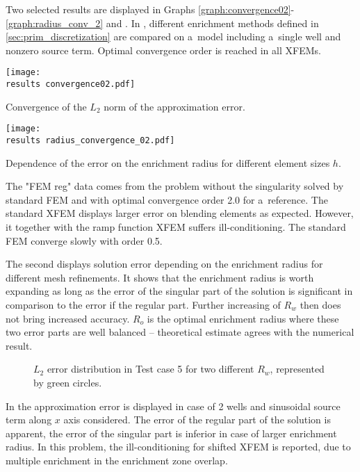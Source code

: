 Two selected results are displayed in Graphs \ref{graph:convergence02}-\ref{graph:radius_conv_2} and .
In , different enrichment methods defined in \ref{sec:prim_discretization} are compared
on a~model including a~single well and nonzero source term.
Optimal convergence order is reached in all XFEMs.
\begin{graph}[!htb]
  \centering    
  \texttt{[image: \\results convergence02.pdf]}
  \caption[Convergence comparison graph.]{Convergence of the $L_2$ norm of the approximation error.}
  \label{graph:convergence02}
\end{graph}
%
\begin{graph}[!htb]
  \centering    
  \texttt{[image: \\results radius\_convergence\_02.pdf]}
  \caption[Optimal enrichment radius.]{Dependence of the error on the enrichment radius for different
  element sizes $h$.}
  \label{graph:radius_conv_2}
\end{graph}
The "FEM reg" data comes from the problem without the singularity solved by standard FEM and with optimal convergence order 2.0 for a~reference.
The standard XFEM displays larger error on blending elements as expected.
However, it together with the ramp function XFEM suffers ill-conditioning.
The standard FEM converge slowly with order 0.5.

The second  displays solution error depending on the enrichment radius
for different mesh refinements. It shows that the enrichment radius is worth expanding as long as
the error of the singular part of the solution is significant in comparison to the error if the regular part.
Further increasing of $R_w$ then does not bring increased accuracy. $R_o$ is the optimal enrichment radius
where these two error parts are well balanced -- theoretical estimate agrees with the numerical result.

\begin{figure}[!htb]
  \centering
  \caption[Error distribution in Test case 5.]{$L_2$ error distribution in Test case 5 for two different $R_w$,
  represented by green circles.}
  \label{fig:error_distribution_test5}
\end{figure}
In  the approximation error is displayed
in case of 2 wells and sinusoidal source term along $x$ axis considered. The error of the regular part of the solution is apparent, 
the error of the singular part is inferior in case of larger enrichment radius.
In this problem, the ill-conditioning for shifted XFEM is reported, due
to multiple enrichment in the enrichment zone overlap.
